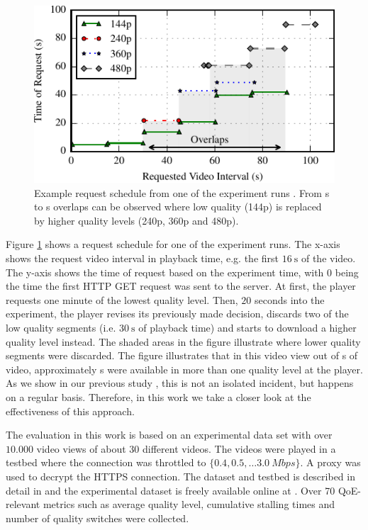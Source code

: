 \begin{figure}[t]
\centering
\includegraphics[width=\columnwidth]{figs/eg_request_schedule}%
\caption{Example request schedule from one of the experiment runs \cite{sieber16sacrificing}. From \unit[30]{s} to \unit[90]{s} overlaps can be observed where low quality (144p) is replaced by higher quality levels (240p, 360p and 480p).}
\label{fig:request_schedule}%
\end{figure}

Figure \ref{fig:request_schedule} shows a request schedule for one of the experiment runs.
The x-axis shows the request video interval in playback time, e.g. the first $\SI{16}{\second}$ of the video.
The y-axis shows the time of request based on the experiment time, with $0$ being the time the first HTTP GET request was sent to the server.
At first, the player requests one minute of the lowest quality level.
Then, ${20}$ seconds into the experiment, the player revises its previously made decision, discards two of the low quality segments (i.e. $\SI{30}{\second}$ of playback time) and starts to download a higher quality level instead.
The shaded areas in the figure illustrate where lower quality segments were discarded.
The figure illustrates that in this video view out of \unit[105]{s} of video, approximately \unit[60]{s} were available in more than one quality level at the player. 
As we show in our previous study \cite{sieber16sacrificing}, this is not an isolated incident, but happens on a regular basis. 
Therefore, in this work we take a closer look at the effectiveness of this approach.

The evaluation in this work is based on an experimental data set with over $10.000$ video views of about $30$ different videos.
The videos were played in a testbed where the connection was throttled to $\{0.4, 0.5, \dots \SI{3.0}{Mbps}\}$.
A proxy was used to decrypt the HTTPS connection.
The dataset and testbed is described in detail in \cite{sieber16sacrificing,sieber15costaggressive} and the experimental dataset is freely available online at \cite{traces}. 
Over 70 QoE-relevant metrics such as average quality level, cumulative stalling times and number of quality switches were collected.


